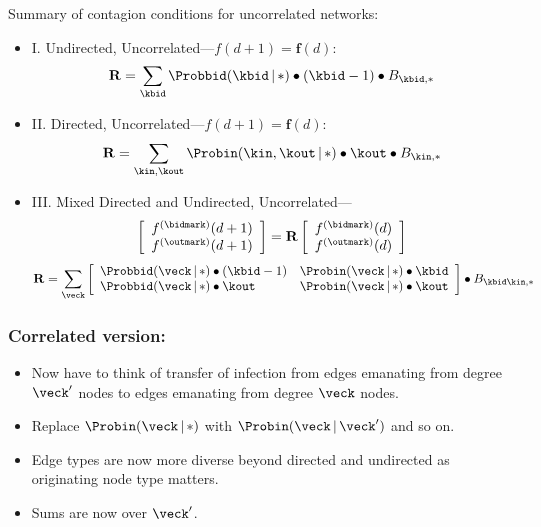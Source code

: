 \begin{frame}

  \begin{block}{Summary of contagion conditions for uncorrelated networks:}
  \begin{itemize}
    \item<1->
      I. Undirected, Uncorrelated---$f(d+1) = \mathbf f(d)$:
      $$
      \mathbf{R} = 
      \sum_{\kbid}
      \Probbid(\kbid\, |\, \ast)
      \bullet
      (\kbid-1)
      \bullet
      B_{\kbid,\ast}
      $$
    \item<2->
      II. Directed, Uncorrelated---$f(d+1) = \mathbf f(d)$:
      $$
      \mathbf{R} = 
      \sum_{\kin,\kout}
      \Probin(\kin,\kout\, |\, \ast)
      \bullet
      \kout
      \bullet
      B_{\kin,\ast}
      $$
    \item<3->
      III. Mixed Directed and Undirected, Uncorrelated---
      $$
      \left[
        \begin{array}{c}
          f^{\textnormal{(\bidmark)}}(d+1) \\
          f^{\textnormal{(\outmark)}}(d+1)
        \end{array}
      \right]
      =
      \mathbf{R} 
      \left[
        \begin{array}{c}
          f^{\textnormal{(\bidmark)}}(d) \\
          f^{\textnormal{(\outmark)}}(d)
        \end{array}
      \right]
      $$
      $$
      \mathbf{R} 
      = 
      \sum_{\veck}
      \left[
        \begin{array}{ll}
          \Probbid(\veck\,|\, \ast)
          \bullet
          (\kbid-1)
          &
          \Probin(\veck\,|\, \ast)
          \bullet
          \kbid
          \\
          \Probbid(\veck\,|\, \ast)
          \bullet
          \kout
          &
          \Probin(\veck\,|\, \ast)
          \bullet
          \kout
        \end{array}
      \right]
      \bullet
      B_{\kbid\kin,\ast}
      $$
    \end{itemize}
  \end{block}

\end{frame}


\begin{frame}
  \frametitle{Correlated version:}
  
  \begin{itemize}
  \item<1->
    Now have to think of transfer of infection
    from edges emanating from degree $\veck'$
    nodes 
    to edges emanating from 
    degree $\veck$ nodes.
  \item<2->
    Replace 
    $\Probin(\veck\,|\, \ast)$ with
    $\Probin(\veck\,|\, \veck')$ and so on.
  \item<3->
    Edge types are now more diverse beyond
    directed and undirected as originating node
    type matters.
  \item<4->
    Sums are now over $\veck'$.
  \end{itemize}

\end{frame}


